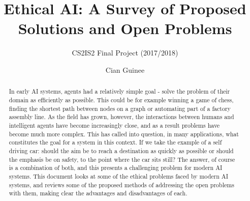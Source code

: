 \documentclass{svproc}
\begin{document}
\mainmatter
\title{Ethical AI: A Survey of Proposed Solutions and Open Problems}
\subtitle{CS2IS2 Final Project (2017/2018)}
\author{Cian Guinee}


\maketitle              %

\begin{abstract}
In early AI systems, agents had a relatively simple goal - solve the problem of their domain as efficiently as possible. This could be for example winning a game of chess, finding the shortest path between nodes on a graph or automating part of a factory assembly line. As the field has grown, however, the interactions between humans and intelligent agents have become increasingly close, and as a result problems have become much more complex. This has called into question, in many applications, what constitutes the goal for a system in this context. If we take the example of a self driving car: should the aim be to reach a destination as quickly as possible or should the emphasis be on safety, to the point where the car sits still? The answer, of course is a combination of both, and this presents a challenging problem for modern AI systems. This document looks at some of the ethical problems faced by modern AI systems, and reviews some of the proposed methods of addressing the open problems with them, making clear the advantages and disadvantages of each.
\end{abstract}
%
\end{document}
